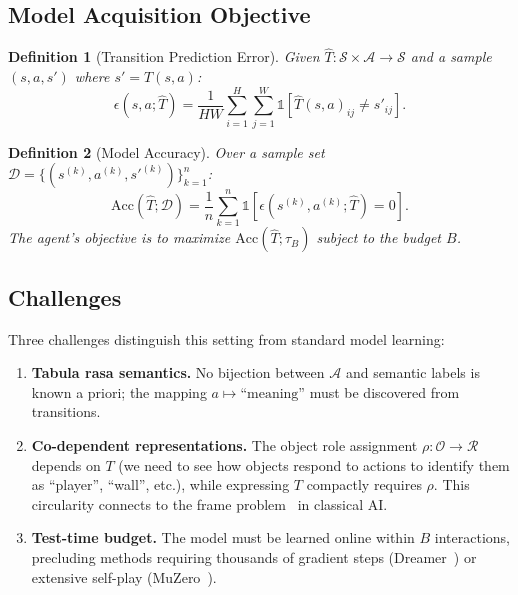 \documentclass{article}
\newtheorem{definition}{Definition}
\newcommand{\calS}{\mathcal{S}}
\newcommand{\calA}{\mathcal{A}}
\newcommand{\calO}{\mathcal{O}}
\newcommand{\calD}{\mathcal{D}}
\newcommand{\calR}{\mathcal{R}}
\newcommand{\ind}{\mathbb{1}}
\begin{document}
\subsection{Model Acquisition Objective}
\label{sec:objective}

\begin{definition}[Transition Prediction Error]
\label{def:pred_error}
Given $\hat{T} : \calS \times \calA \to \calS$ and a sample $(s, a, s')$ where $s' = T(s, a)$:
\begin{equation}
\epsilon(s, a; \hat{T}) = \frac{1}{HW} \sum_{i=1}^{H} \sum_{j=1}^{W} \ind[\hat{T}(s, a)_{ij} \neq s'_{ij}].
\end{equation}
\end{definition}

\begin{definition}[Model Accuracy]
\label{def:accuracy}
Over a sample set $\calD = \{(s^{(k)}, a^{(k)}, s'^{(k)})\}_{k=1}^n$:
\begin{equation}
\text{Acc}(\hat{T}; \calD) = \frac{1}{n} \sum_{k=1}^n \ind[\epsilon(s^{(k)}, a^{(k)}; \hat{T}) = 0].
\end{equation}
The agent's objective is to maximize $\text{Acc}(\hat{T}; \tau_B)$ subject to the budget $B$.
\end{definition}

\subsection{Challenges}
\label{sec:challenges}

Three challenges distinguish this setting from standard model learning:

\begin{enumerate}[nosep]
    \item \textbf{Tabula rasa semantics.}  No bijection between $\calA$ and semantic labels is known a priori; the mapping $a \mapsto \text{``meaning''}$ must be discovered from transitions.

    \item \textbf{Co-dependent representations.}  The object role assignment $\rho : \calO \to \calR$ depends on $T$ (we need to see how objects respond to actions to identify them as ``player'', ``wall'', etc.), while expressing $T$ compactly requires $\rho$.  This circularity connects to the frame problem~\cite{mccarthy1969some} in classical AI.

    \item \textbf{Test-time budget.}  The model must be learned online within $B$ interactions, precluding methods requiring thousands of gradient steps (Dreamer~\cite{hafner2020dreamer}) or extensive self-play (MuZero~\cite{schrittwieser2020muzero}).
\end{enumerate}
\end{document}
